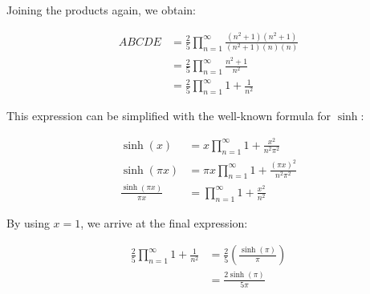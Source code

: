 \documentclass{letter}
\begin{document}
\begin{letter}{}
Joining the products again, we obtain:

\begin{align*}
ABCDE &= 
     \frac{2}{5} \prod_{n=1}^{\infty}
     \frac{\left(n^2+1\right) \left(n^2+1\right)}
     {\left(n^2+1\right)\left(n\right)\left(n\right)} \\
  &= \frac{2}{5} \prod_{n=1}^{\infty}
     \frac{n^2+1}{n^2}\\
  &= \frac{2}{5} \prod_{n=1}^{\infty}
     1+\frac{1}{n^2}
\end{align*}

This expression can be simplified with the well-known formula for $\sinh$:

\begin{align*}
  \sinh\left(x\right) &=
  x \prod_{n=1}^{\infty}1+\frac{x^2}{n^2 \pi^2} \\
  \sinh\left(\pi x\right) &= \pi x
    \prod_{n=1}^{\infty}1+\frac{\left(\pi x\right)^2}{n^2 \pi^2} \\
  \frac{\sinh\left(\pi x\right)}{\pi x} &= 
    \prod_{n=1}^{\infty}1+\frac{x^2}{n^2}
\end{align*}

By using $x=1$, we arrive at the final expression:

\begin{align*}
  \frac{2}{5} \prod_{n=1}^{\infty}
     1+\frac{1}{n^2} &= 
  \frac{2}{5} \left(\frac{\sinh\left(\pi\right)}{\pi}\right) \\
  &= \frac{2\sinh\left(\pi\right)}{5\pi} 
\end{align*}

\end{letter}
\end{document}
